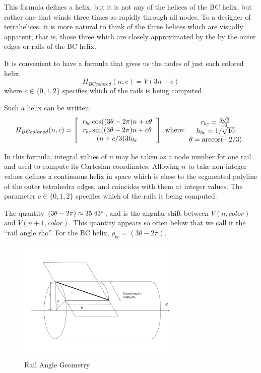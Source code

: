 \documentclass[11pt]{article}
\begin{document}
This formula defines a helix, but it is not any of the helices of the BC helix, but rather one that winds three times
as rapidly through all nodes. To a designer of tetrahelices, it is more natural to think of the three helices which
are visually apparent, that is, those three which are closely approximated by the by the outer edges or rails of the BC helix.

It is convenient to have a formula that gives us the nodes of just
each colored helix.
\[
H_{BCcolored}(n,c) = V(3n +c)
\]
where $c \in \{0,1,2\}$ specifies which of the rails is being computed.

Such a helix can be written:
\[
H_{BCcolored}(n,c) =
\left [
  \begin{tabular}{c}
   $ r_{bc}  \cos((3 \theta - 2 \pi)n + c  \theta $\\
   $ r_{bc} \sin((3 \theta - 2 \pi)n + c  \theta $\\
   $ (n + c/3) 3  h_{bc} $
  \end{tabular}
  \right ],
\text{where:}
  \begin{tabular}{c}
 $ r_{bc} = \frac{3\sqrt{3}}{10} $\\
 $ h_{bc} = 1/\sqrt{10} $ \\
 $ \theta = \arccos(-2/3) $ \\
  \end{tabular}      
  \]

In this formula, integral values of $n$ may be taken as a node number for one rail and used to compute its Cartesian
coordinates. Allowing $n$ to take non-integer values defines a continuous
helix in space which is close to the segmented polyline of the outer tetrahedra edges, and coincides with them at integer
values.
The parameter $c \in \{0,1,2\}$ specifies which of the rails is being computed.

The quantity $ (3 \theta - 2 \pi) \approx 35.43 \degree $, and is the angular shift between $V(n,color)$ and
$V(n+1,color)$. This quantity appears so often below that we call it the ``rail angle rho''. For the BC helix, $\rho_{bc} = (3 \theta - 2 \pi)$.

\begin{figure}[H]
  \label{railanglefig}
     \centering
     \includegraphics[width=0.7\textwidth]{figures/RailAngleGeometry.png}
     \caption{Rail Angle Geometry}
 \end{figure}
\end{document}
